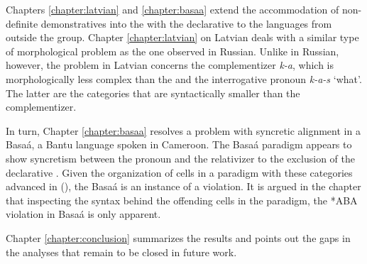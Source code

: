 \par
Chapters \ref{chapter:latvian} and \ref{chapter:basaa} extend the accommodation of non-definite demonstratives into the  with the declarative  to the languages from outside the  group. 
Chapter \ref{chapter:latvian} on Latvian deals with a similar type of morphological  problem as the one observed in Russian. Unlike in Russian, however, the  problem in Latvian concerns the complementizer \textit{k-a}, which is morphologically less complex than the  and the interrogative pronoun \textit{k-a-s} `what'. The latter are the categories that are syntactically smaller than the complementizer. 
\par 
In turn, Chapter \ref{chapter:basaa} resolves a problem with syncretic  alignment in a  Basa\'a, a Bantu language spoken in Cameroon. The Basa\'a paradigm appears to show syncretism between the  pronoun and the relativizer to the exclusion of the declarative . Given the organization of cells in a paradigm with these categories advanced in \citeauthor{BaunazLander2017} (\citeyear{BaunazLander2017,Baunaz-Lander-Glossa}), the Basa\'a  is an instance of a  violation. It is argued in the chapter that inspecting the syntax behind the offending cells in the paradigm, the *ABA violation in Basa\'a is only apparent. 
\par
Chapter \ref{chapter:conclusion} summarizes the results and points out the gaps in the analyses that remain to be closed in future work.





 
